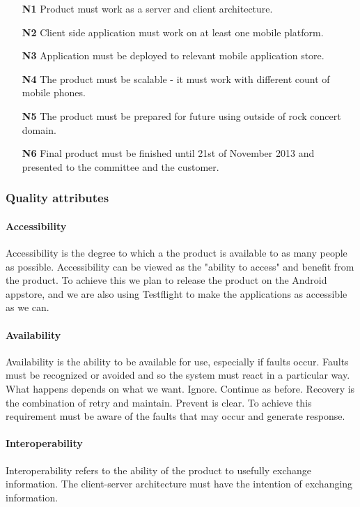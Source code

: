 \begin{enumerate}
\item[\textbf{N1}] \label{req_N1} Product must work as a server and client architecture.
\item[\textbf{N2}] \label{req_N2} Client side application must work on at least one mobile platform.
\item[\textbf{N3}] \label{req_N3} Application must be deployed to relevant mobile application store.
\item[\textbf{N4}] \label{req_N4} The product must be scalable - it must work with different count of mobile phones.
\item[\textbf{N5}] \label{req_N5} The product must be prepared for future using outside of rock concert domain.
\item[\textbf{N6}] \label{req_N6} Final product must be finished until 21st of November 2013 and presented to the committee and the customer.
\end{enumerate}

\subsubsection{Quality attributes}
\label{sec:quality_attributes}

\paragraph{Accessibility}
Accessibility is the degree to which a the product is available to as many people as possible. 
Accessibility can be viewed as the "ability to access" and benefit from the product. 
To achieve this we plan to release the product on the Android appstore, and we are also using Testflight to make the applications as accessible as we can.

\paragraph{Availability}

Availability is the ability to be available for use, especially if faults occur. Faults must be recognized or avoided and so the system must react in a particular way. What happens depends on what we want. Ignore. Continue as before. Recovery is the combination of retry and maintain. Prevent is clear. To achieve this requirement must be aware of the faults that may occur and generate response.

\paragraph{Interoperability}
Interoperability refers to the ability of the product to usefully exchange information. The client-server architecture must have the intention of exchanging information. 

